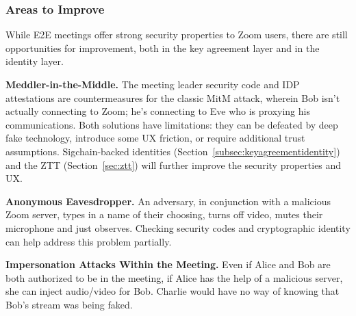 \subsubsection{Areas to Improve}
While E2E meetings offer strong security properties to Zoom users, there are still opportunities for
improvement, both in the key agreement layer and in the identity layer.
\begin{description}
\item {\bf Meddler-in-the-Middle.} The meeting leader security code and IDP attestations are
countermeasures for the classic MitM attack, wherein Bob isn't actually connecting to Zoom; he's
connecting to Eve who is proxying his communications. Both solutions have limitations: they can be
defeated by deep fake technology, introduce some UX friction, or require additional trust assumptions.
Sigchain-backed identities (Section~\ref{subsec:keyagreementidentity}) and the ZTT
(Section~\ref{sec:ztt}) will further improve the security properties and UX.
\item {\bf Anonymous Eavesdropper.} An adversary, in conjunction with a malicious Zoom server, types
in a name of their choosing, turns off video, mutes their microphone and just observes. Checking
security codes and cryptographic identity can help address this problem partially.
\item {\bf Impersonation Attacks Within the Meeting.} Even if Alice and Bob are both authorized to
be in the meeting, if Alice has the help of a malicious server, she can inject audio/video for Bob.
Charlie would have no way of knowing that Bob's stream was being faked.
\end{description}
